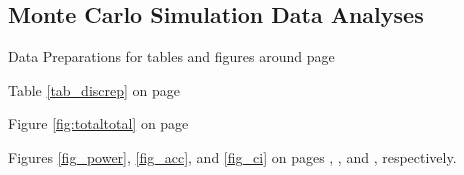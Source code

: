 \documentclass[]{DissertateCUNY}
\begin{document}
\normalsize

\clearpage

\hypertarget{monte-carlo-simulation-data-analyses}{%
\subsection*{Monte Carlo Simulation Data
Analyses}\label{monte-carlo-simulation-data-analyses}}

Data Preparations for tables and figures around page
\pageref{tab_discrep}

\small

\normalsize

Table \ref{tab_discrep} on page \pageref{tab_discrep}

\small

\normalsize

Figure \ref{fig:totaltotal} on page \pageref{fig:totaltotal}

\small

\normalsize

Figures \ref{fig_power}, \ref{fig_acc}, and \ref{fig_ci} on pages
\pageref{fig_power}, \pageref{fig_acc}, and \pageref{fig_ci},
respectively.

\small

\normalsize
\end{document}
